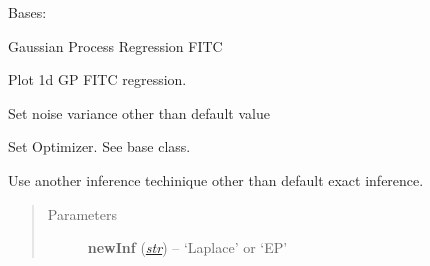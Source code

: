 \documentclass[letterpaper,10pt,english]{sphinxmanual}
\begin{document}

\begin{fulllineitems}
\label{pyGPs.Core:pyGPs.Core.gp.GPR_FITC}
Bases: {\hyperref[pyGPs.Core:pyGPs.Core.gp.GP_FITC]{}}

Gaussian Process Regression FITC

\begin{fulllineitems}
\label{pyGPs.Core:pyGPs.Core.gp.GPR_FITC.plot}
Plot 1d GP FITC regression.

\end{fulllineitems}


\begin{fulllineitems}
\label{pyGPs.Core:pyGPs.Core.gp.GPR_FITC.setNoise}
Set noise variance other than default value

\end{fulllineitems}


\begin{fulllineitems}
\label{pyGPs.Core:pyGPs.Core.gp.GPR_FITC.setOptimizer}
Set Optimizer. See base class.

\end{fulllineitems}


\begin{fulllineitems}
\label{pyGPs.Core:pyGPs.Core.gp.GPR_FITC.useInference}
Use another inference techinique other than default exact inference.
\begin{quote}\begin{description}
\item[{Parameters}] \leavevmode
\textbf{newInf} (\href{http://docs.python.org/library/functions.html\#str}{\emph{str}}) -- `Laplace' or `EP'


\end{description}
\end{quote}
\end{fulllineitems}
\end{fulllineitems}
\end{document}

